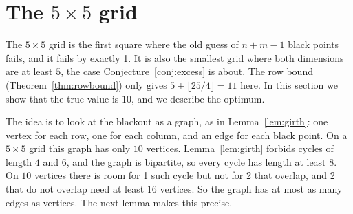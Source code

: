 \documentclass[12pt]{article}
\theoremstyle{definition}\newtheorem{definition}{Definition}
\theoremstyle{remark}\newtheorem{remark}{Remark}
\begin{document}
\section{The $5\times 5$ grid}\label{sec:uniqueness}

The $5\times5$ grid is the first square where the old guess of $n+m-1$ black
points fails, and it fails by exactly 1. It is also the smallest grid where
both dimensions are at least $5$, the case Conjecture~\ref{conj:excess} is
about. The row bound (Theorem~\ref{thm:rowbound}) only gives $5+\lfloor25/4\rfloor=11$
here. In this section we show that the true value is $10$, and we describe the
optimum.

The idea is to look at the blackout as a graph, as in Lemma~\ref{lem:girth}:
one vertex for each row, one for each column, and an edge for each black point.
On a $5\times5$ grid this graph has only $10$ vertices. Lemma~\ref{lem:girth}
forbids cycles of length $4$ and $6$, and the graph is bipartite, so every
cycle has length at least $8$. On $10$ vertices there is room for 1 such cycle
but not for 2 that overlap, and 2 that do not overlap need at least $16$
vertices. So the graph has at most as many edges as vertices. The next lemma
makes this precise.
\end{document}
